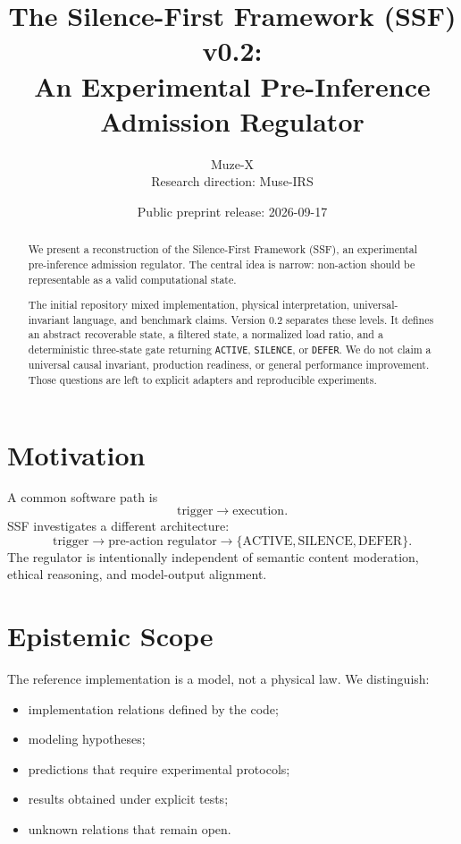 \documentclass[11pt]{article}
\title{The Silence-First Framework (SSF) v0.2:\\An Experimental Pre-Inference Admission Regulator}
\author{Muze-X \\ \small{Research direction: Muse-IRS}}
\date{Public preprint release: 2026-09-17}
\begin{document}
\maketitle

\begin{abstract}
We present a reconstruction of the Silence-First Framework (SSF), an
experimental pre-inference admission regulator. The central idea is narrow:
non-action should be representable as a valid computational state.

The initial repository mixed implementation, physical interpretation,
universal-invariant language, and benchmark claims. Version 0.2 separates
these levels. It defines an abstract recoverable state, a filtered state, a
normalized load ratio, and a deterministic three-state gate returning
\texttt{ACTIVE}, \texttt{SILENCE}, or \texttt{DEFER}. We do not claim a
universal causal invariant, production readiness, or general performance
improvement. Those questions are left to explicit adapters and reproducible
experiments.
\end{abstract}

\section{Motivation}

A common software path is
\[
\text{trigger} \rightarrow \text{execution}.
\]
SSF investigates a different architecture:
\[
\text{trigger} \rightarrow \text{pre-action regulator}
\rightarrow \{\text{ACTIVE},\text{SILENCE},\text{DEFER}\}.
\]
The regulator is intentionally independent of semantic content moderation,
ethical reasoning, and model-output alignment.

\section{Epistemic Scope}

The reference implementation is a model, not a physical law. We distinguish:
\begin{itemize}
\item implementation relations defined by the code;
\item modeling hypotheses;
\item predictions that require experimental protocols;
\item results obtained under explicit tests;
\item unknown relations that remain open.
\end{itemize}
\end{document}
